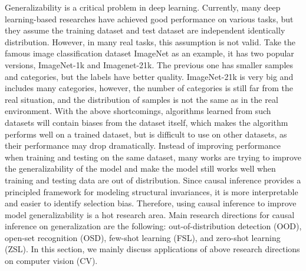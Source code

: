 \documentclass{article}
\begin{document}
Generalizability is a critical problem in deep learning. Currently, many deep learning-based researches
have achieved good performance on various tasks, but they assume the training dataset and test dataset
are independent identically distribution. However, in many real tasks, this assumption is not valid.
Take the famous image classification dataset ImageNet as an example, it has two popular versions, ImageNet-1k
and Imagenet-21k. The previous one has smaller samples and categories, but the labels have better quality.
ImageNet-21k is very big and includes many categories, however, the number of categories is still far
from the real situation,
and the distribution of samples is not the same as in the real environment. With the above shortcomings,
algorithms learned from such datasets will contain biases from the dataset itself, which makes the
algorithm performs well on a trained dataset, but is difficult to use on other datasets, as their
performance may drop dramatically. Instead of improving performance when training and testing on
the same dataset, many works are trying to improve the generalizability of the model and make the model
still works well when training and testing data are out of distribution. Since causal inference
provides a principled framework for modeling structural invariances, it is more interpretable and
easier to identify selection bias. Therefore, using causal inference to improve model
generalizability is a hot research area. Main research directions for causal
inference on generalization are the following: out-of-distribution detection (OOD), open-set recognition (OSD),
few-shot learning (FSL), and zero-shot learning (ZSL). In this section, we mainly discuss applications
of above research directions on computer vision (CV).
\end{document}
